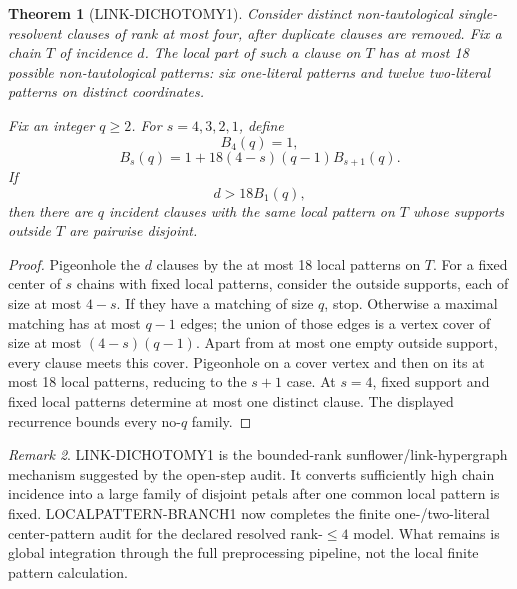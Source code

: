 \documentclass[11pt]{article}
\theoremstyle{plain}
\newtheorem{theorem}{Theorem}[section]
\theoremstyle{definition}
\theoremstyle{remark}
\newtheorem{remark}[theorem]{Remark}
\begin{document}
\begin{theorem}[LINK-DICHOTOMY1]
Consider distinct non-tautological single-resolvent clauses of rank at most
four, after duplicate clauses are removed. Fix a chain $T$ of incidence $d$.
The local part of such a clause on $T$ has at most 18 possible non-tautological
patterns: six one-literal patterns and twelve two-literal patterns on distinct
coordinates.

Fix an integer $q\ge2$. For $s=4,3,2,1$, define
\[
B_4(q)=1,
\]
\[
B_s(q)
=
1+18(4-s)(q-1)B_{s+1}(q).
\]
If
\[
\boxed{
d>18B_1(q),
}
\]
then there are $q$ incident clauses with the same local pattern on $T$ whose
supports outside $T$ are pairwise disjoint.
\end{theorem}

\begin{proof}
Pigeonhole the $d$ clauses by the at most 18 local patterns on $T$.
For a fixed center of $s$ chains with fixed local patterns, consider the
outside supports, each of size at most $4-s$. If they have a matching of size
$q$, stop. Otherwise a maximal matching has at most $q-1$ edges; the union of
those edges is a vertex cover of size at most $(4-s)(q-1)$. Apart from at most
one empty outside support, every clause meets this cover. Pigeonhole on a
cover vertex and then on its at most 18 local patterns, reducing to the
$s+1$ case. At $s=4$, fixed support and fixed local patterns determine at most
one distinct clause. The displayed recurrence bounds every no-$q$ family.
\end{proof}

\begin{remark}
LINK-DICHOTOMY1 is the bounded-rank sunflower/link-hypergraph mechanism suggested
by the open-step audit. It converts sufficiently high chain incidence into a
large family of disjoint petals after one common local pattern is fixed.
LOCALPATTERN-BRANCH1 now completes the finite one-/two-literal center-pattern
audit for the declared resolved rank-$\le4$ model. What remains is global
integration through the full preprocessing pipeline, not the local finite
pattern calculation.
\end{remark}
\end{document}
